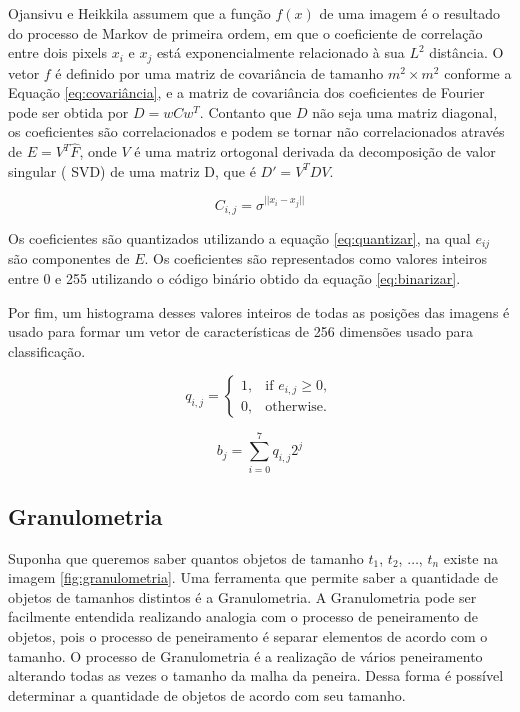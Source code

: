 Ojansivu e Heikkila \cite{ojansivu2008blur} assumem que a função $f(x)$ de uma imagem é o resultado do processo de Markov de primeira ordem, em que o coeficiente de correlação entre dois pixels $x_i$ e $x_j$ está exponencialmente relacionado à sua $L^2$ distância. O vetor $f$ é definido por uma matriz de covariância de tamanho $m^2 \times m^2$ conforme a Equação \ref{eq:covariância}, e a matriz de covariância dos coeficientes de Fourier pode ser obtida por $D = wC{w}^T$. Contanto que $D$ não seja uma matriz diagonal, os coeficientes são correlacionados e podem se tornar não correlacionados através de $E = V^T\hat{F}$, onde $V$ é uma matriz ortogonal derivada da decomposição de valor singular ( SVD) de uma matriz D, que é $D' = V^TDV$.

\begin{equation}
	C_{i,j} = \sigma^{||x_{i} - x_{j}||}
	\label{eq:covariancia}
\end{equation}

Os coeficientes são quantizados utilizando a equação \ref{eq:quantizar}, na qual $e_{ij}$ são componentes de $E$. Os coeficientes são representados como valores inteiros entre 0 e 255 utilizando o código binário obtido da equação \ref{eq:binarizar}.

Por fim, um histograma desses valores inteiros de todas as posições das imagens é usado para formar um vetor de características de 256 dimensões usado para classificação. 

\begin{equation}
	q_{i,j} = \left\{ 
	\begin{array}{ll}
		1, & \mbox{if $e_{i,j} \geq 0$},\\
		0, & \mbox{otherwise}.
	\end{array} \right.
	\label{eq:quantizar}
\end{equation}

\begin{equation}
	b_{j} = \sum_{i=0}^{7} q_{i,j}2^j
	\label{eq:binarizar}
\end{equation}

\subsection{Granulometria}

Suponha que queremos saber quantos objetos de tamanho $t_1$, $t_2$, $\dots$, $t_n$ existe na imagem \ref{fig:granulometria}. Uma ferramenta que permite saber a quantidade de objetos de tamanhos distintos é a Granulometria. A Granulometria pode ser facilmente entendida realizando analogia com o processo de peneiramento de objetos, pois o processo de peneiramento é separar elementos de acordo com o tamanho. O processo de Granulometria é a realização de vários peneiramento alterando todas as vezes o tamanho da malha da peneira. Dessa forma é possível determinar a quantidade de objetos de acordo com seu tamanho.

